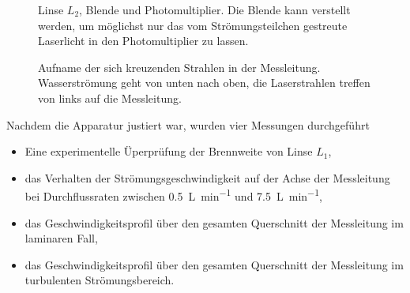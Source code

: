 \begin{figure}[h!t]
    \centering
    \resizebox{.6\textwidth}{!}{}
    \caption{%
        Linse  $L_2$, Blende  und Photomultiplier. Die  Blende kann  verstellt
        werden,  um  m\"oglichst  nur  das  vom Str\"omungsteilchen  gestreute
        Laserlicht in den Photomultiplier zu lassen.
    }
    \label{fig:versuchsanordnung:blende}
\end{figure}

\begin{figure}[h!t]
    \centering
    \resizebox{.67\textwidth}{!}{}
    \caption{%
        Aufname      der     sich      kreuzenden     Strahlen      in     der
        Messleitung. Wasserstr\"omung   geht   von   unten  nach   oben,   die
        Laserstrahlen treffen von links auf die Messleitung.
    }
    \label{fig:laserkreuzung}
\end{figure}


\clearpage
Nachdem die Apparatur justiert war, wurden vier Messungen durchgef\"uhrt\footnotemark[3]

\begin{itemize}
    \item
        Eine experimentelle \"Uperpr\"ufung der Brennweite von Linse $L_1$,
    \item
        das  Verhalten  der  Str\"omungsgeschwindigkeit   auf  der  Achse  der
        Messleitung  bei Durchflussraten  zwischen \SI{0.5}{\liter\per\minute}
        und \SI{7.5}{\liter\per\minute},
    \item
        das  Geschwindigkeitsprofil   \"uber  den  gesamten   Querschnitt  der
        Messleitung im laminaren Fall,
    \item
        das  Geschwindigkeitsprofil   \"uber  den  gesamten   Querschnitt  der
        Messleitung im turbulenten Str\"omungsbereich.
\end{itemize}


